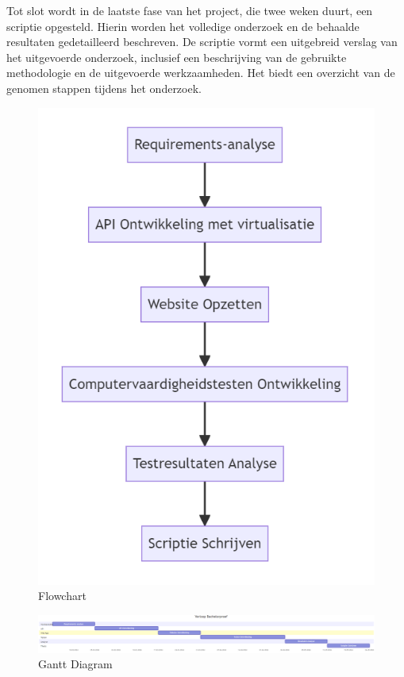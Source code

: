 Tot slot wordt in de laatste fase van het project, die twee weken duurt, een scriptie opgesteld. Hierin worden het volledige onderzoek en de behaalde resultaten gedetailleerd beschreven. De scriptie vormt een uitgebreid verslag van het uitgevoerde onderzoek, inclusief een beschrijving van de gebruikte methodologie en de uitgevoerde werkzaamheden. Het biedt een overzicht van de genomen stappen tijdens het onderzoek.


\begin{figure}[ht]
  \centering
  \includegraphics[width=\linewidth]{./graphics/flowchart.png}
  \caption{Flowchart}
  \label{fig:flowchart}
\end{figure}

\begin{figure}[ht]
  \centering
  \includegraphics[width=\linewidth]{./graphics/gantt.png}
  \caption{Gantt Diagram}
  \label{fig:gantt}
\end{figure}

